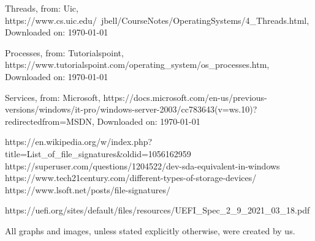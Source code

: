 \begin{thebibliography}{10}
	Threads, from: Uic,
	https://www.cs.uic.edu/~jbell/CourseNotes/OperatingSystems/4_Threads.html,
	Downloaded on: \today

	Processes, from: Tutorialspoint,
	https://www.tutorialspoint.com/operating_system/os_processes.htm,
	Downloaded on: \today

	Services, from: Microsoft,
	https://docs.microsoft.com/en-us/previous-versions/windows/it-pro/windows-server-2003/cc783643(v=ws.10)?redirectedfrom=MSDN,
	Downloaded on: \today

\bibitem{}
	

\end{thebibliography}


https://en.wikipedia.org/w/index.php?title=List\_of\_file\_signatures&oldid=1056162959
https://superuser.com/questions/1204522/dev-sda-equivalent-in-windows
https://www.tech21century.com/different-types-of-storage-devices/
https://www.lsoft.net/posts/file-signatures/

https://uefi.org/sites/default/files/resources/UEFI\_Spec\_2\_9\_2021\_03\_18.pdf

%
All graphs and images, unless stated explicitly otherwise, were created by us. 
